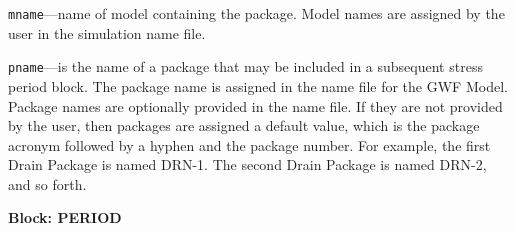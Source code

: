 \begin{description}
\item \texttt{mname}---name of model containing the package.  Model names are assigned by the user in the simulation name file.

\item \texttt{pname}---is the name of a package that may be included in a subsequent stress period block.  The package name is assigned in the name file for the GWF Model.  Package names are optionally provided in the name file.  If they are not provided by the user, then packages are assigned a default value, which is the package acronym followed by a hyphen and the package number.  For example, the first Drain Package is named DRN-1.  The second Drain Package is named DRN-2, and so forth.

\end{description}
\item \textbf{Block: PERIOD}

